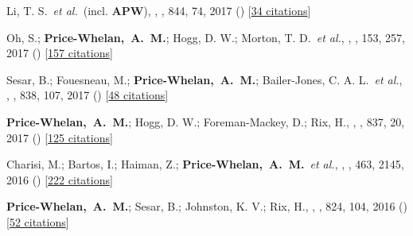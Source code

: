 {\item[{\color{deemph}\scriptsize27}]Li, T. S.~\textit{et al.}~(incl. \textbf{APW}), , \apj, 844, 74, 2017 () [\href{http://adsabs.harvard.edu/abs/2017ApJ...844...74L}{34 citations}]

\item[{\color{deemph}\scriptsize26}]Oh, S.; \textbf{Price-Whelan,~A.~M.}; Hogg, D. W.; Morton, T. D.~\textit{et al.}, , \aj, 153, 257, 2017 () [\href{http://adsabs.harvard.edu/abs/2017AJ....153..257O}{157 citations}]

\item[{\color{deemph}\scriptsize25}]Sesar, B.; Fouesneau, M.; \textbf{Price-Whelan,~A.~M.}; Bailer-Jones, C. A. L.~\textit{et al.}, , \apj, 838, 107, 2017 () [\href{http://adsabs.harvard.edu/abs/2017ApJ...838..107S}{48 citations}]

\item[{\color{deemph}\scriptsize24}]\textbf{Price-Whelan,~A.~M.}; Hogg, D. W.; Foreman-Mackey, D.; Rix, H., , \apj, 837, 20, 2017 () [\href{http://adsabs.harvard.edu/abs/2017ApJ...837...20P}{125 citations}]

\item[{\color{deemph}\scriptsize23}]Charisi, M.; Bartos, I.; Haiman, Z.; \textbf{Price-Whelan,~A.~M.}~\textit{et al.}, , \mnras, 463, 2145, 2016 () [\href{http://adsabs.harvard.edu/abs/2016MNRAS.463.2145C}{222 citations}]

\item[{\color{deemph}\scriptsize22}]\textbf{Price-Whelan,~A.~M.}; Sesar, B.; Johnston, K. V.; Rix, H., , \apj, 824, 104, 2016 () [\href{http://adsabs.harvard.edu/abs/2016ApJ...824..104P}{52 citations}]

}
